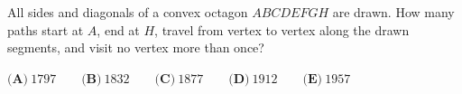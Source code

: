All sides and diagonals of a convex octagon $ABCDEFGH$ are drawn. How many paths start at $A$, end at $H$, travel from vertex to vertex along the drawn segments, and visit no vertex more than once?

$\textbf{(A)}\ 1797\qquad\textbf{(B)}\ 1832\qquad\textbf{(C)}\ 1877\qquad\textbf{(D)}\ 1912\qquad\textbf{(E)}\ 1957$
